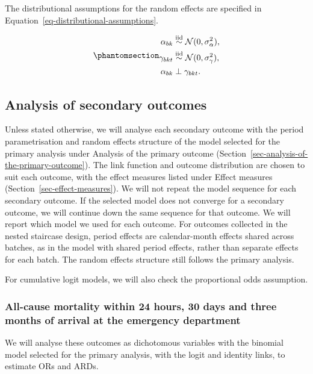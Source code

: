 \documentclass[
]{scrartcl}
\begin{document}
The distributional assumptions for the random effects are specified in
Equation~\ref{eq-distributional-assumptions}.

\begin{equation}\phantomsection\label{eq-distributional-assumptions}{
\begin{aligned}
\alpha_{bk} &\overset{\text{iid}}{\sim} \mathcal{N}(0,\sigma^2_{\alpha}), \\
\gamma_{bkt} &\overset{\text{iid}}{\sim} \mathcal{N}(0,\sigma^2_{\gamma}), \\
\alpha_{bk} &\perp \gamma_{bkt}.
\end{aligned}
}\end{equation}

\subsection{Analysis of secondary
outcomes}\label{sec-analysis-of-secondary-outcomes}

Unless stated otherwise, we will analyse each secondary outcome with the
period parametrisation and random effects structure of the model
selected for the primary analysis under Analysis of the primary outcome
(Section~\ref{sec-analysis-of-the-primary-outcome}). The link function
and outcome distribution are chosen to suit each outcome, with the
effect measures listed under Effect measures
(Section~\ref{sec-effect-measures}). We will not repeat the model
sequence for each secondary outcome. If the selected model does not
converge for a secondary outcome, we will continue down the same
sequence for that outcome. We will report which model we used for each
outcome. For outcomes collected in the nested staircase design, period
effects are calendar-month effects shared across batches, as in the
model with shared period effects, rather than separate effects for each
batch. The random effects structure still follows the primary analysis.

For cumulative logit models, we will also check the proportional odds
assumption.

\subsubsection{All-cause mortality within 24 hours, 30 days and three
months of arrival at the emergency
department}\label{sec-all-cause-mortality-within-24-hours-30-days-and-three-months-of-arrival-at-the-emergency-department}

We will analyse these outcomes as dichotomous variables with the
binomial model selected for the primary analysis, with the logit and
identity links, to estimate ORs and ARDs.
\end{document}
